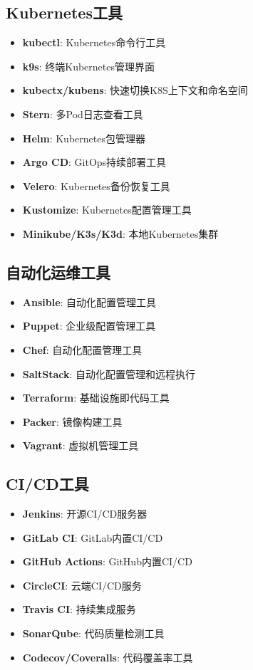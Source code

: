 \documentclass[12pt,UTF8]{ctexbook}
\begin{document}
\subsection*{Kubernetes工具}

\begin{itemize}
    \item \textbf{kubectl}: Kubernetes命令行工具
    \item \textbf{k9s}: 终端Kubernetes管理界面
    \item \textbf{kubectx/kubens}: 快速切换K8S上下文和命名空间
    \item \textbf{Stern}: 多Pod日志查看工具
    \item \textbf{Helm}: Kubernetes包管理器
    \item \textbf{Argo CD}: GitOps持续部署工具
    \item \textbf{Velero}: Kubernetes备份恢复工具
    \item \textbf{Kustomize}: Kubernetes配置管理工具
    \item \textbf{Minikube/K3s/K3d}: 本地Kubernetes集群
\end{itemize}

\subsection*{自动化运维工具}

\begin{itemize}
    \item \textbf{Ansible}: 自动化配置管理工具
    \item \textbf{Puppet}: 企业级配置管理工具
    \item \textbf{Chef}: 自动化配置管理工具
    \item \textbf{SaltStack}: 自动化配置管理和远程执行
    \item \textbf{Terraform}: 基础设施即代码工具
    \item \textbf{Packer}: 镜像构建工具
    \item \textbf{Vagrant}: 虚拟机管理工具
\end{itemize}

\subsection*{CI/CD工具}

\begin{itemize}
    \item \textbf{Jenkins}: 开源CI/CD服务器
    \item \textbf{GitLab CI}: GitLab内置CI/CD
    \item \textbf{GitHub Actions}: GitHub内置CI/CD
    \item \textbf{CircleCI}: 云端CI/CD服务
    \item \textbf{Travis CI}: 持续集成服务
    \item \textbf{SonarQube}: 代码质量检测工具
    \item \textbf{Codecov/Coveralls}: 代码覆盖率工具
\end{itemize}
\end{document}
